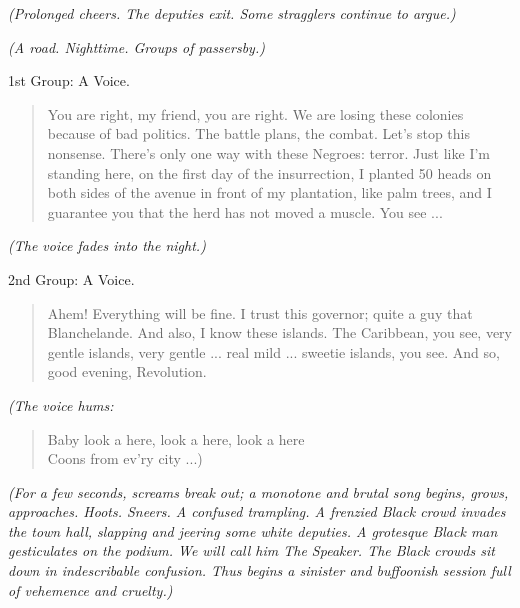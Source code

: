 \documentclass[letterpaper,article,12pt,oneside,notitlepage]{memoir}
\begin{document}
\textit{(Prolonged cheers. The deputies exit. Some stragglers continue to argue.)}

\textit{(A road. Nighttime. Groups of passersby.)}

\begin{center}1st Group: A Voice.\end{center}

\begin{verse}
\indent You are right, my friend, you are right. We are losing these colonies because of bad politics. The battle plans, the combat. Let's stop this nonsense. There's only one way with these Negroes: terror. Just like I'm standing here, on the first day of the insurrection, I planted 50 heads on both sides of the avenue in front of my plantation, like palm trees, and I guarantee you that the herd has not moved a muscle. You see ... \\
\end{verse}

\textit{(The voice fades into the night.)}

\begin{center}2nd Group: A Voice.\end{center}

\begin{verse}
\indent Ahem! Everything will be fine. I trust this governor; quite a guy that Blanchelande. And also, I know these islands. The Caribbean, you see, very gentle islands, very gentle ... real mild ... sweetie islands, you see. And so, good evening, Revolution. \\
\end{verse}

\clearpage

\textit{(The voice hums:}

\begin{verse}
\hspace{1cm} Baby look a here, look a here, look a here \\
\hspace{1cm} Coons from ev'ry city ...) \\
\end{verse}

\textit{(For a few seconds, screams break out; a monotone and brutal song begins, grows, approaches. Hoots. Sneers. A confused trampling. A frenzied Black crowd invades the town hall, slapping and jeering some white deputies. A grotesque Black man gesticulates on the podium. We will call him The Speaker. The Black crowds sit down in indescribable confusion. Thus begins a sinister and buffoonish session full of vehemence and cruelty.)}
\end{document}
